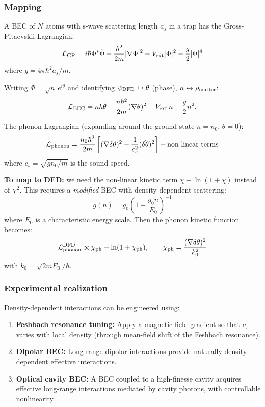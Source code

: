 \documentclass[11pt,a4paper]{article}
\begin{document}
\subsubsection{Mapping}

A BEC of $N$ atoms with s-wave scattering length $a_s$ in a trap has the Gross-Pitaevskii Lagrangian:
\begin{equation}
\mathcal{L}_{\rm GP} = i\hbar\Phi^*\dot\Phi - \frac{\hbar^2}{2m}|\nabla\Phi|^2 - V_{\rm ext}|\Phi|^2 - \frac{g}{2}|\Phi|^4
\end{equation}
where $g = 4\pi\hbar^2 a_s/m$.

Writing $\Phi = \sqrt{n}\,e^{i\theta}$ and identifying $\psi_{\rm DFD} \leftrightarrow \theta$ (phase), $n \leftrightarrow \rho_{\rm matter}$:
\begin{equation}
\mathcal{L}_{\rm BEC} = n\hbar\dot\theta - \frac{n\hbar^2}{2m}(\nabla\theta)^2 - V_{\rm ext}\,n - \frac{g}{2}n^2.
\end{equation}

The phonon Lagrangian (expanding around the ground state $n = n_0$, $\theta = 0$):
\begin{equation}
\mathcal{L}_{\rm phonon} = \frac{n_0\hbar^2}{2m}\left[(\nabla\delta\theta)^2 - \frac{1}{c_s^2}(\dot{\delta\theta})^2\right] + \text{non-linear terms}
\end{equation}
where $c_s = \sqrt{gn_0/m}$ is the sound speed.

\textbf{To map to DFD:} we need the non-linear kinetic term $\chi - \ln(1+\chi)$ instead of $\chi^2$. This requires a \emph{modified} BEC with density-dependent scattering:
\begin{equation}
g(n) = g_0\left(1 + \frac{g_0 n}{E_0}\right)^{-1}
\end{equation}
where $E_0$ is a characteristic energy scale. Then the phonon kinetic function becomes:
\begin{equation}
\mathcal{L}_{\rm phonon}^{\rm DFD} \propto \chi_{\rm ph} - \ln(1 + \chi_{\rm ph}), \qquad \chi_{\rm ph} = \frac{(\nabla\delta\theta)^2}{k_0^2}
\end{equation}
with $k_0 = \sqrt{2mE_0}/\hbar$.

\subsubsection{Experimental realization}

Density-dependent interactions can be engineered using:
\begin{enumerate}
\item \textbf{Feshbach resonance tuning:} Apply a magnetic field gradient so that $a_s$ varies with local density (through mean-field shift of the Feshbach resonance).
\item \textbf{Dipolar BEC:} Long-range dipolar interactions provide naturally density-dependent effective interactions.
\item \textbf{Optical cavity BEC:} A BEC coupled to a high-finesse cavity acquires effective long-range interactions mediated by cavity photons, with controllable nonlinearity.
\end{enumerate}
\end{document}
